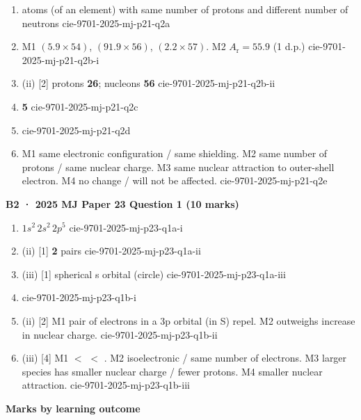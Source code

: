 \documentclass[10pt,a4paper]{article}
\begin{document}
\begin{enumerate}[label=\textbf{(\alph*)}, leftmargin=1.8em]
\item [1] atoms (of an element) with same number of protons and different number of neutrons \hfill {\footnotesize cie-9701-2025-mj-p21-q2a}
\item [2] M1 $(5.9\times 54)$, $(91.9\times 56)$, $(2.2\times 57)$. M2 $A_\mathrm{r}=\mathbf{55.9}$ (1 d.p.) \hfill {\footnotesize cie-9701-2025-mj-p21-q2b-i}
\item[] (ii) [2] protons \textbf{26}; nucleons \textbf{56} \hfill {\footnotesize cie-9701-2025-mj-p21-q2b-ii}
\item [1] \textbf{5} \hfill {\footnotesize cie-9701-2025-mj-p21-q2c}
\item [1]  \hfill {\footnotesize cie-9701-2025-mj-p21-q2d}
\item [4] M1 same electronic configuration / same shielding. M2 same number of protons / same nuclear charge. M3 same nuclear attraction to outer-shell electron. M4 no change / will not be affected. \hfill {\footnotesize cie-9701-2025-mj-p21-q2e}
\end{enumerate}

{\normalsize\bfseries B2 · 2025 MJ Paper 23 Question 1 (10 marks)}

\begin{enumerate}[label=\textbf{(\alph*)}, leftmargin=1.8em]
\item [1] $1s^{2}\,2s^{2}\,2p^{5}$ \hfill {\footnotesize cie-9701-2025-mj-p23-q1a-i}
\item[] (ii) [1] \textbf{2} pairs \hfill {\footnotesize cie-9701-2025-mj-p23-q1a-ii}
\item[] (iii) [1] spherical s orbital (circle) \hfill {\footnotesize cie-9701-2025-mj-p23-q1a-iii}
\item [1]  \hfill {\footnotesize cie-9701-2025-mj-p23-q1b-i}
\item[] (ii) [2] M1 pair of electrons in a 3p orbital (in S) repel. M2 outweighs increase in nuclear charge. \hfill {\footnotesize cie-9701-2025-mj-p23-q1b-ii}
\item[] (iii) [4] M1  $<$  $<$ . M2 isoelectronic / same number of electrons. M3 larger species has smaller nuclear charge / fewer protons. M4 smaller nuclear attraction. \hfill {\footnotesize cie-9701-2025-mj-p23-q1b-iii}
\end{enumerate}

\vspace{0.35em}
{\normalsize\bfseries Marks by learning outcome}
\end{document}

